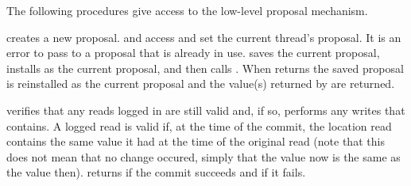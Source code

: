 The following procedures give access to the low-level proposal mechanism.
\begin{protos}
\end{protos}
\noindent
{} creates a new proposal.
 and  access and set
 the current thread's proposal.
It is an error to pass to  a proposal that
 is already in use.
 saves the current proposal, installs  as
 the current proposal, and then calls .
When  returns the saved proposal is reinstalled as the current
 proposal
 and the value(s) returned by  are returned.

 verifies that any reads logged in  are
 still valid and, if so, performs any writes that  contains.
A logged read is valid if, at the time of the commit, the location read contains
 the same value it had at the time of the original read (note that this does
 not mean that no change occured, simply that the value now is the same as
 the value then).
 returns  if the commit succeeds and 
 if it fails.

